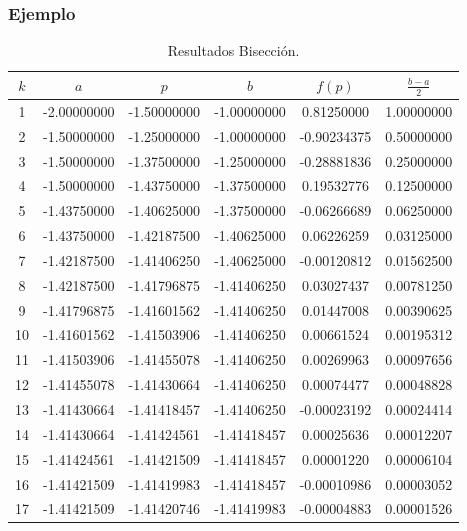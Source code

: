 \documentclass{beamer}
\begin{document}
\begin{frame}
  \frametitle{Ejemplo}
  \scriptsize{
  \begin{table}[!ht]
    \begin{center}
      \begin{tabular}{|c||c||c||c||c||c|}\hline
      $k$  & $a$ & $p$ & $b$ & $f(p)$ & $\frac{b-a}{2}$\\\hline\hline
      1 & -2.00000000 & -1.50000000 & -1.00000000 & 0.81250000 & 1.00000000 \\\hline 
    2 & -1.50000000 & -1.25000000 & -1.00000000 & -0.90234375 & 0.50000000 \\\hline
    3 & -1.50000000 & -1.37500000 & -1.25000000 & -0.28881836 & 0.25000000 \\\hline
    4 & -1.50000000 & -1.43750000 & -1.37500000 & 0.19532776 & 0.12500000 \\\hline
    5 & -1.43750000 & -1.40625000 & -1.37500000 & -0.06266689 & 0.06250000 \\\hline
    6 & -1.43750000 & -1.42187500 & -1.40625000 & 0.06226259 & 0.03125000 \\\hline
    7 & -1.42187500 & -1.41406250 & -1.40625000 & -0.00120812 & 0.01562500 \\\hline
    8 & -1.42187500 & -1.41796875 & -1.41406250 & 0.03027437 & 0.00781250 \\\hline
    9 & -1.41796875 & -1.41601562 & -1.41406250 & 0.01447008 & 0.00390625 \\\hline
    10 & -1.41601562 & -1.41503906 & -1.41406250 & 0.00661524 & 0.00195312 \\\hline
    11 & -1.41503906 & -1.41455078 & -1.41406250 & 0.00269963 & 0.00097656 \\\hline
    12 & -1.41455078 & -1.41430664 & -1.41406250 & 0.00074477 & 0.00048828 \\\hline
    13 & -1.41430664 & -1.41418457 & -1.41406250 & -0.00023192 & 0.00024414 \\\hline
    14 & -1.41430664 & -1.41424561 & -1.41418457 & 0.00025636 & 0.00012207 \\\hline
    15 & -1.41424561 & -1.41421509 & -1.41418457 & 0.00001220 & 0.00006104 \\\hline
    16 & -1.41421509 & -1.41419983 & -1.41418457 & -0.00010986 & 0.00003052 \\\hline
    17 & -1.41421509 & -1.41420746 & -1.41419983 & -0.00004883 & 0.00001526\\\hline
     \end{tabular}
     \caption{Resultados Bisecci\'on.}\end{center}
     \label{tab_bisecc}
    \end{table}}
\end{frame}
\end{document}
